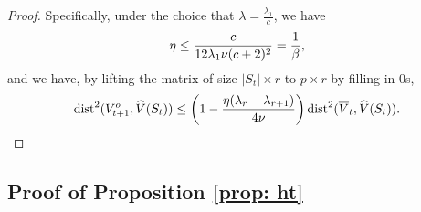 \documentclass[11pt]{article}
\newcommand{\rev}[1]{\textcolor{black}{#1}}
\newcommand{\hU}{\widehat{V}}
\newcommand{\gd}{\overline{V}}
\newcommand{\0}{{\mathbf{0}}}
\begin{document}
\begin{proof}
\par Specifically, under the choice that $\lambda=\frac{\lambda_1}{c}$, we have \begin{equation*}
\eta \leq  \frac{c}{12\lambda_1\rev{\nu}(c+2)^2}=\frac{1}{\beta},
\end{equation*}
and we have, by lifting the matrix of size $|S_t|\times r$ to $p\times r$ by filling in 0s, \begin{equation*}
\mathrm{dist}^2(V_{t+1}^o, \hU(S_t))\leq\left(1-\frac{\eta(\lambda_r-\lambda_{r+1})}{4\rev{\nu}}\right)\mathrm{dist}^2(\gd_t,\hU(S_t)).
\end{equation*}
\end{proof}



\subsection{Proof of Proposition \ref{prop: ht}}
\label{sec:proof-ht}
\end{document}
